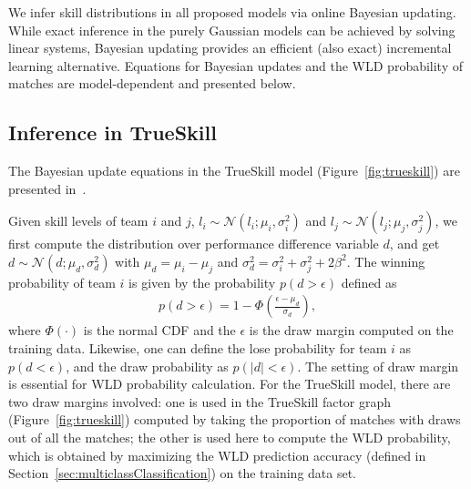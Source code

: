 \label{sec:inference}

We infer skill distributions in all proposed models via
online Bayesian updating.  While exact inference in the purely Gaussian
models can be achieved by solving linear systems, Bayesian
updating provides an efficient (also exact) incremental learning alternative.
Equations for Bayesian updates and the WLD probability of matches are
model-dependent and presented below.

\subsection{Inference in TrueSkill}

The Bayesian update equations in the TrueSkill model
(Figure~\ref{fig:trueskill}) are presented
in~\cite{herbrich06569}.

 Given skill levels of
team $i$ and $j$, $l_i\sim\mathcal{N}(l_i;\mu_i,\sigma_i^2)$ and
$l_j\sim\mathcal{N}(l_j;\mu_j,\sigma_j^2)$, we first compute the
distribution over performance difference variable $d$, and get
$d\sim\mathcal{N}(d;\mu_d,\sigma_d^2)$ with $\mu_d = \mu_i - \mu_j$
and $\sigma_d^2 = \sigma_i^2 + \sigma_j^2+2\beta^2$. The winning
probability of team $i$ is given by the probability $p(d>\epsilon)$ defined as
\begin{align}
  p(d>\epsilon) = 1 - \Phi\left(\frac{\epsilon-\mu_d}{\sigma_d}\right),
\end{align}
where $\Phi(\cdot)$ is the normal CDF and the $\epsilon$ is the draw margin computed on the training data. Likewise, one can define the lose probability for team $i$ as $p(d<\epsilon)$, and the draw probability as $p(|d|<\epsilon)$. The setting of draw margin is essential for WLD probability calculation. For the TrueSkill model, there are two draw margins involved: one is used in the TrueSkill factor graph (Figure~\ref{fig:trueskill}) computed by taking the proportion of matches with draws out of all the matches; the other is used here to compute the WLD probability, which is obtained by maximizing the WLD prediction accuracy (defined in Section~\ref{sec:multiclassClassification}) on the training data set. 

